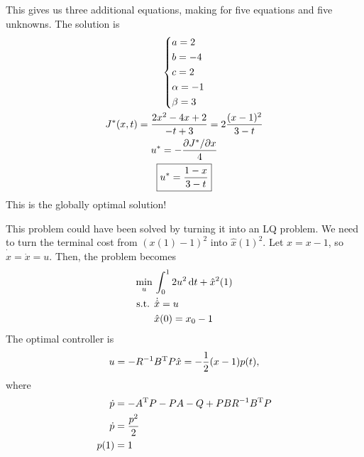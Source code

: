 This gives us three additional equations, making for five equations and five unknowns. The solution is
\begin{gather}
  \begin{dcases}
    a = 2 \\
    b = -4 \\
    c = 2 \\
    \alpha = -1 \\
    \beta = 3
  \end{dcases} \\
  J^*(x,t) = \frac{2x^2 - 4x + 2}{-t + 3} = 2 \frac{(x-1)^2}{3-t} \\
  u^* = -\frac{\partial J^*/\partial x}{4} \\
  \boxed{u^* = \frac{1-x}{3-t}}
\end{gather}
This is the globally optimal solution!

This problem could have been solved by turning it into an LQ problem. We need to turn the terminal cost from $(x(1)-1)^2$ into $\hat x(1)^2$. Let $\hat x=x-1$, so $\dot{\hat x}=\dot x=u$. Then, the problem becomes
\begin{align}
  \min_u {} & \int_0^1 2u^2\mathop{}\!\mathrm{d} t + \hat x^2(1) \\
  \text{s.t. } & \dot{\hat x}=u \\
            & \hat x(0) = x_0 - 1
\end{align}
The optimal controller is
\begin{gather}
  u = -R^{-1} B^\text{T} P \hat x = -\frac12 (x-1) p(t),
\end{gather}
where
\begin{align}
  \dot p &= -A^\text{T} P - PA - Q + PBR^{-1}B^\text{T} P \\
  \dot p &= \frac{p^2}{2} \\
  p(1) &= 1
\end{align}

